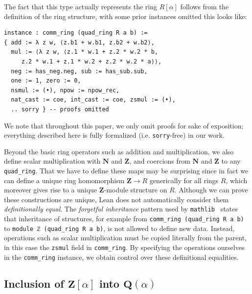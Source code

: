 \documentclass[sigplan,10pt,nonacm,
screen]{acmart} \settopmatter{printfolios=true,printccs=false,printacmref=false}
\newcommand{\mathlib}{\lstinline{mathlib}\xspace}
\newcommand{\QQ}{\mathbf{Q}}
\newcommand{\ZZ}{\mathbf{Z}}
\newcommand{\NN}{\mathbf{N}}
\begin{document}
    The fact that this type actually represents the ring $R[\alpha]$ follows from the definition of the ring structure, with some prior instances omitted this looks like:
\begin{lstlisting}
instance : comm_ring (quad_ring R a b) :=
{ add := λ z w, ⟨z.b1 + w.b1, z.b2 + w.b2⟩,
  mul := ⟨λ z w, ⟨z.1 * w.1 + z.2 * w.2 * b,
     z.2 * w.1 + z.1 * w.2 + z.2 * w.2 * a⟩⟩,
  neg := has_neg.neg, sub := has_sub.sub,
  one := 1, zero := 0,
  nsmul := (•), npow := npow_rec,
  nat_cast := coe, int_cast := coe, zsmul := (•),
  .. sorry } -- proofs omitted
\end{lstlisting}

We note that throughout this paper, we only omit proofs for sake of exposition; everything described here is fully formalized (i.e. \lstinline{sorry}-free) in our work.

    Beyond the basic ring operators such as addition and multiplication, we also define scalar multiplication with $\NN$ and $\ZZ$, and coercions from $\NN$ and $\ZZ$ to any \lstinline{quad_ring}.
    That we have to define these maps may be surprising since in fact we can define a unique ring homomorphism $\ZZ \to R$ generically for all rings $R$, which moreover gives rise to a unique $\ZZ$-module structure on $R$.
    Although we can prove these constructions are unique, Lean does not automatically consider them \emph{definitionally equal}.
    The \emph{forgetful inheritance} pattern used by \mathlib~\cite{Forgetful-inheritance,typeclasses} states that inheritance of structures,
    for example from \lstinline{comm_ring (quad_ring R a b)} to \lstinline{module ℤ (quad_ring R a b)},
    is not allowed to define new data.
    Instead, operations such as scalar multiplication must be copied literally from the parent, in this case the \lstinline{zsmul} field in \lstinline{comm_ring}.
    By specifying the operations ourselves in the \lstinline{comm_ring} instance, we obtain control over these definitional equalities.

    \subsection{Inclusion of $\ZZ[\alpha]$ into $\QQ(\alpha)$} \label{sec:quad_ring_algebra}
\end{document}
